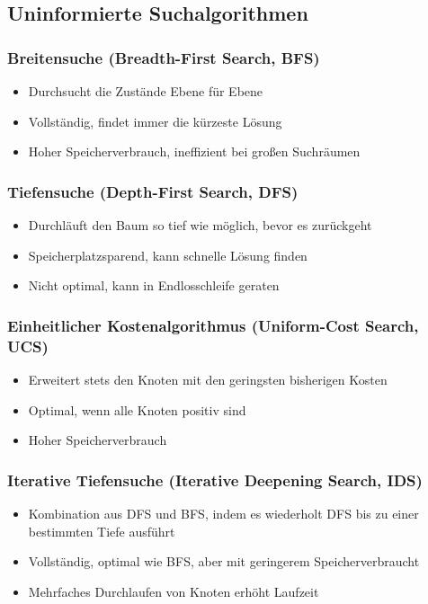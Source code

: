 \subsection{Uninformierte Suchalgorithmen}
\subsubsection*{Breitensuche (Breadth-First Search, BFS)}
\begin{itemize}
    \item Durchsucht die Zustände Ebene für Ebene
    \item {} Vollständig, findet immer die kürzeste Lösung
    \item {} Hoher Speicherverbrauch, ineffizient bei großen Suchräumen
\end{itemize}
\subsubsection*{Tiefensuche (Depth-First Search, DFS)}
\begin{itemize}
    \item Durchläuft den Baum so tief wie möglich, bevor es zurückgeht
    \item {} Speicherplatzsparend, kann schnelle Lösung finden
    \item {} Nicht optimal, kann in Endlosschleife geraten
\end{itemize}
\subsubsection*{Einheitlicher Kostenalgorithmus (Uniform-Cost Search, UCS)}
\begin{itemize}
    \item Erweitert stets den Knoten mit den geringsten bisherigen Kosten
    \item {} Optimal, wenn alle Knoten positiv sind
    \item {} Hoher Speicherverbrauch
\end{itemize}
\subsubsection*{Iterative Tiefensuche (Iterative Deepening Search, IDS)}
\begin{itemize}
    \item Kombination aus DFS und BFS, indem es wiederholt DFS bis zu einer bestimmten Tiefe ausführt
    \item {} Vollständig, optimal wie BFS, aber mit geringerem Speicherverbraucht
    \item {} Mehrfaches Durchlaufen von Knoten erhöht Laufzeit
\end{itemize}
